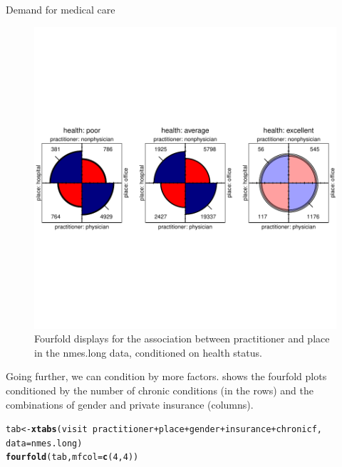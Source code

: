 \documentclass[11pt]{book}\usepackage[]{graphicx}\usepackage[]{color}
\makeatletter
\newcommand{\hlnum}[1]{\textcolor[rgb]{0.686,0.059,0.569}{#1}}%
\newcommand{\hlopt}[1]{\textcolor[rgb]{0,0,0}{#1}}%
\newcommand{\hlstd}[1]{\textcolor[rgb]{0.345,0.345,0.345}{#1}}%
\newcommand{\hlkwb}[1]{\textcolor[rgb]{0.69,0.353,0.396}{#1}}%
\newcommand{\hlkwc}[1]{\textcolor[rgb]{0.333,0.667,0.333}{#1}}%
\newcommand{\hlkwd}[1]{\textcolor[rgb]{0.737,0.353,0.396}{\textbf{#1}}}%
\newenvironment{kframe}{%
 \def\at@end@of@kframe{}%
 \ifinner\ifhmode%
  \def\at@end@of@kframe{\end{minipage}}%
  \begin{minipage}{\columnwidth}%
 \fi\fi%
 \def\FrameCommand##1{\hskip\@totalleftmargin \hskip-\fboxsep
 \colorbox{shadecolor}{##1}\hskip-\fboxsep
     \hskip-\linewidth \hskip-\@totalleftmargin \hskip\columnwidth}%
 \MakeFramed {\advance\hsize-\width
   \@totalleftmargin\z@ \linewidth\hsize
   \@setminipage}}%
 {\par\unskip\endMakeFramed%
 \at@end@of@kframe}
\newenvironment{knitrout}{}{} %
\renewenvironment{knitrout}{\small\renewcommand{\baselinestretch}{.85}}{} %
\makeatother
\begin{document}
\begin{Example}[nmes4]{Demand for medical care}
\begin{knitrout}
\begin{figure}[!htbp]
\centerline{\includegraphics[width=\textwidth,trim=0 130 0 130,clip]{ch09/fig/nmes4-fourfold1-1} }

\caption[Fourfold displays for the association between practitioner and place in the nmes]{Fourfold displays for the association between practitioner and place in the nmes.long data, conditioned on health status.\label{fig:nmes4-fourfold1}}
\end{figure}


\end{knitrout}

Going further, we can condition by  more factors.   shows the fourfold plots conditioned by
the number of chronic conditions (in the rows) and the combinations of
gender and  private insurance (columns).

\begin{knitrout}
\color{fgcolor}\begin{kframe}
\begin{alltt}
\hlstd{tab} \hlkwb{<-} \hlkwd{xtabs}\hlstd{(visit} \hlopt{~} \hlstd{practitioner} \hlopt{+} \hlstd{place} \hlopt{+} \hlstd{gender} \hlopt{+} \hlstd{insurance} \hlopt{+} \hlstd{chronicf,}
             \hlkwc{data}\hlstd{=nmes.long)}
\hlkwd{fourfold}\hlstd{(tab,} \hlkwc{mfcol}\hlstd{=}\hlkwd{c}\hlstd{(}\hlnum{4}\hlstd{,}\hlnum{4}\hlstd{))}
\end{alltt}
\end{kframe}\begin{figure}[!htbp]



\end{figure}
\end{knitrout}
\end{Example}
\end{document}
